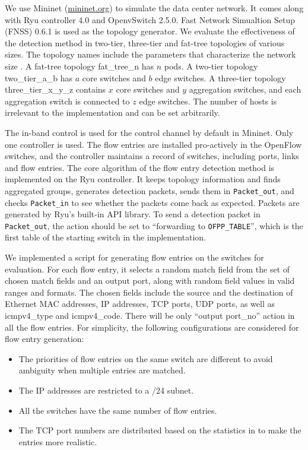 \documentclass[conference]{IEEEtran}
\begin{document}
We use Mininet (\url{mininet.org}) to simulate the data center network. It comes along with Ryu controller 4.0 and OpenvSwitch 2.5.0. Fast Network Simualtion Setup (FNSS) 0.6.1 is used as the topology generator. We evaluate the effectiveness of the detection method in two-tier, three-tier and fat-tree topologies of various sizes. The topology names include the parameters that characterize the network size \cite{FNSS}. A fat-tree topology fat\_tree\_n has $n$ pods. A two-tier topology two\_tier\_a\_b has $a$ core switches and $b$ edge switches. A three-tier topology three\_tier\_x\_y\_z contains $x$ core switches and $y$ aggregation switches, and each aggregation switch is connected to $z$ edge switches. The number of hosts is irrelevant to the implementation and can be set arbitrarily.

The in-band control is used for the control channel by default in Mininet. Only one controller is used. The flow entries are installed pro-actively in the OpenFlow switches, and the controller maintains a record of switches, including ports, links and flow entries. The core algorithm of the flow entry detection method is implemented on the Ryu controller. It keeps topology information and finds aggregated groups, generates detection packets, sends them in \texttt{Packet\_out}, and checks \texttt{Packet\_in} to see whether the packets come back as expected. Packets are generated by Ryu's built-in API library. To send a detection packet in \texttt{Packet\_out}, the action should be set to ``forwarding to \texttt{OFPP\_TABLE}'', which is the first table of the starting switch in the implementation.

We implemented a script for generating flow entries on the switches for evaluation. For each flow entry, it selects a random match field from the set of chosen match fields and an output port, along with random field values in valid ranges and formats. The chosen fields include the source and the destination of Ethernet MAC addresses, IP addresses, TCP ports, UDP ports, as well as icmpv4\_type and icmpv4\_code. There will be only ``output port\_no'' action in all the flow entries. For simplicity, the following configurations are considered for flow entry generation:

\begin{itemize}
\item
The priorities of flow entries on the same switch are different to avoid ambiguity when multiple entries are matched.
\item
The IP addresses are restricted to a /24 subnet.
\item
All the switches have the same number of flow entries. 
\item
The TCP port numbers are distributed based on the statistics in \cite{BREAKDOWN} to make the entries more realistic.
\end{itemize}
\end{document}
